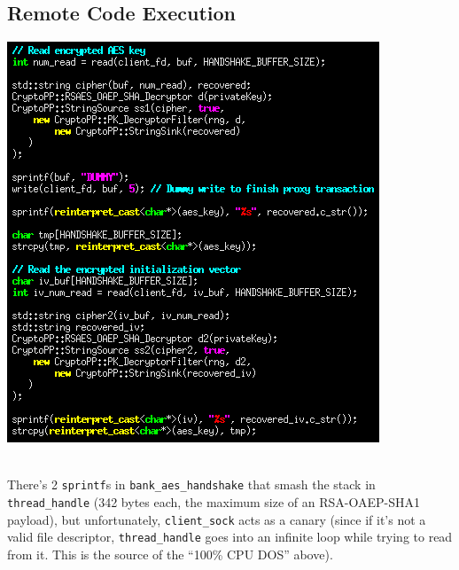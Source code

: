 \documentclass[12pt]{article}
\begin{document}
\subsection*{Remote Code Execution}
\includegraphics[width=\textwidth]{bankscreenshot_cropped.png}
\pagebreak\\
\begin{tikzpicture}

\end{tikzpicture}\\
There's 2 \verb|sprintf|s in \verb|bank_aes_handshake| that smash the stack in \verb|thread_handle| (342 bytes each, the maximum size of an RSA-OAEP-SHA1 payload), but unfortunately, \verb|client_sock| acts as a canary (since if it's not a valid file descriptor, \verb|thread_handle| goes into an infinite loop while trying to read from it. This is the source of the ``100\% CPU DOS'' above).
\end{document}
